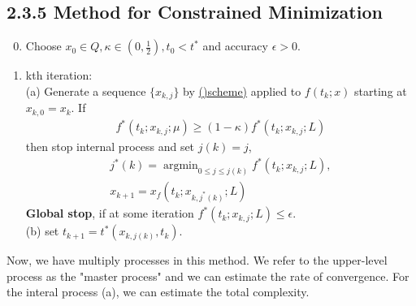 \documentclass[12pt,a4paper]{article}
\DeclareMathOperator*{\argmin}{argmin}
\begin{document}
	\subsection*{2.3.5 Method for Constrained Minimization}\label{sec235}
	 \begin{enumerate}
		\setcounter{enumi}{-1}
		\item Choose $x_0 \in Q,\kappa \in (0, \frac{1}{2}), t_0 < t^*$ and accuracy $\epsilon > 0$.
		\item kth iteration: \\
		(a) Generate a sequence $\{x_{k,j}\}$ by \hyperref[sec:mmschemestrict]{()scheme)} applied to $f(t_k;x)$ starting at $x_{k,0} = x_k$. If
		\begin{align*}
			f^*(t_k;x_{k,j};\mu) \geq (1 - \kappa)f^*(t_k;x_{k,j};L)
		\end{align*}
		then stop internal process and set $j(k) = j$,
		\begin{align*}
			j^*(k) = \argmin_{0 \leq j \leq j(k)}f^*(t_k;x_{k,j};L), \\
			x_{k+1} = x_f(t_k;x_{k,j^*(k)};L)
		\end{align*}
		\textbf{Global stop}, if at some iteration $f^*(t_k;x_{k,j};L) \leq \epsilon$. \\
		(b) set $t_{k+1} = t^*(x_{k,j(k)},t_k)$.
	\end{enumerate}
	Now, we have multiply processes in this method. We refer to the upper-level process as the "master process" and we can estimate the rate of convergence. For the interal process (a), we can estimate the total complexity.
\end{document}
